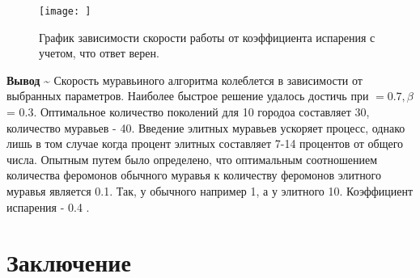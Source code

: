 \documentclass[a4paper, 14pt]{article}
\begin{document}
     \begin{figure}[h!]
        \centering
        \texttt{[image: ]}
       
	 \caption{График зависимости скорости работы от коэффициента испарения с учетом, что ответ верен.}
        \label{grf:eva_time}
    \end{figure}
	
	\textbf{Вывод}
    \~
    
	\hspace{1cm} Скорость муравьиного алгоритма колеблется в зависимости от выбранных параметров. Наиболее быстрое решение удалось достичь при \alpha$ = 0.7, \beta$ = 0.3. Оптимальное количество поколений для 10 городоа составляет 30, количество муравьев - 40. Введение элитных муравьев ускоряет процесс, однако лишь в том случае когда процент элитных составляет 7-14 процентов от общего числа. Опытным путем было определено, что оптимальным соотношением количества феромонов обычного муравья к количеству феромонов элитного муравья является 0.1. Так, у обычного например 1, а у элитного 10. Коэффициент испарения - 0.4 .
	\newpage
	\section*{Заключение}
    
\end{document}
